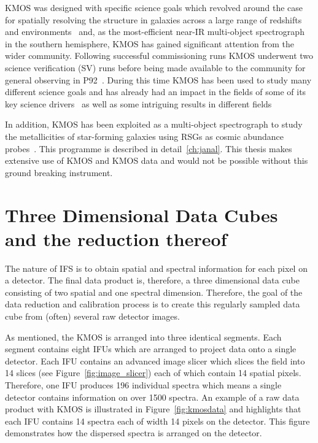 KMOS was designed with specific science goals which revolved around the case for spatially resolving the structure in galaxies across a large range of redshifts and environments~\citep{2006NewAR..50..370S} and,
as the most-efficient near-IR multi-object spectrograph in the southern hemisphere,
KMOS has gained significant attention from the wider community.
Following successful commissioning runs KMOS underwent two science verification (SV) runs before being made available to the community for general observing in P92~\citep{2015IAUS..309...11S}.
During this time KMOS has been used to study many different science goals and has already had an impact in the fields of some of its key science drivers~\citep{2016MNRAS.456.1195H,2016MNRAS.456.4533M} as well as some intriguing results in different fields~\citep{2015A&A...584A...2F,2015MNRAS.453.3875P}

In addition, KMOS has been exploited as a multi-object spectrograph to study the metallicities of star-forming galaxies using RSGs as cosmic abundance probes~\citep{2015ApJ...805..182G,2015ApJ...812..160L,2015ApJ...803...14P}.
This programme is described in detail~\ref{ch:janal}.
This thesis makes extensive use of KMOS and KMOS data and would not be possible without this ground breaking instrument.



\section{Three Dimensional Data Cubes and the reduction thereof} %
\label{sec:3Ddata}

The nature of IFS is to obtain spatial and spectral information for each pixel on a detector.
The final data product is, therefore, a three dimensional data cube consisting of two spatial and one spectral dimension.
Therefore, the goal of the data reduction and calibration process is to create this regularly sampled data cube from (often) several raw detector images.

As mentioned, the KMOS is arranged into three identical segments.
Each segment contains eight IFUs which are arranged to project data onto a single detector.
Each IFU contains an advanced image slicer which slices the field into 14 slices (see Figure~\ref{fig:image_slicer}) each of which contain 14 spatial pixels.
Therefore, one IFU produces 196 individual spectra which means a single detector contains information on over 1500 spectra.
An example of a raw data product with KMOS is illustrated in Figure~\ref{fig:kmosdata} and highlights that each IFU contains 14 spectra each of width 14 pixels on the detector.
This figure demonstrates how the dispersed spectra is arranged on the detector.

